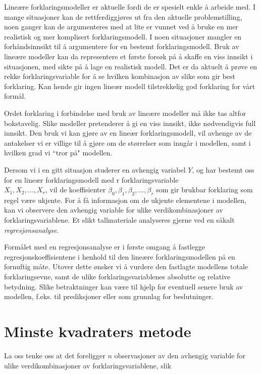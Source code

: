 Lineære forklaringsmodeller er aktuelle fordi de er spesielt enkle å
arbeide med.  I mange situasjoner kan de rettferdiggjøres ut fra den
aktuelle problemstilling, noen ganger kan de argumenteres med at lite er
vunnet ved å bruke en mer realistisk og mer komplisert forklaringsmodell.
I noen situasjoner mangler en forhåndsinnsikt til å argumentere for 
en bestemt forklaringsmodell.  Bruk av lineære modeller kan da
representere et første forsøk på å skaffe en viss innsikt
i situasjonen, med sikte på å lage en rea\-lis\-tisk modell.  Det er da
aktuelt å prøve en rekke forklaringsvariable for å se hvilken
kombinasjon av slike som gir best forklaring.  Kan hende gir ingen lineær
modell tilstrekkelig god forklaring for vårt formål.

Ordet forklaring i forbindelse med bruk av lineære modeller må ikke
tas altfor bokstavelig.  Slike modeller pretenderer å gi en viss innsikt,
ikke nødvendigvis full innsikt.  Den bruk vi kan gjøre av en lineær
for\-klaringsmodell, vil avhenge av de antakelser vi er villige til å 
gjøre om de størrelser som inngår i modellen, samt i hvilken grad
vi ``tror på" modellen.

Dersom vi i en gitt situasjon studerer en avhengig variabel $Y$, og har bestemt
oss for en lineær forklaringsmodell med r forklaringsvariable \\
$X_1,X_2, \ldots , X_r$, vil de koeffisienter ${\beta}_0, {\beta}_1,{\beta}_2,
\ldots , {\beta}_r $ som gir brukbar forklaring som regel være ukjente.
For å få informasjon om de ukjente elementene i modellen, kan vi
observere den avhengig variable for ulike verdikombinasjoner av
forklaringsvariablene.  Et slikt tallmateriale analyseres gjerne ved en
såkalt {\em regresjonsanalyse}.

Formålet med en regresjonsanalyse er i første omgang å fastlegge
regresjonskoeffisientene i henhold til den lineære forklaringsmodellen
på en fornuftig måte.  Utover dette ønsker vi å vurdere den
fastlagte modellens totale forklaringsevne, samt de ulike 
forklaringsvariablenes absolutte og rela\-tive betydning.  Slike betraktninger
kan være til hjelp for eventuell senere bruk av modellen, f.eks. til
prediksjoner eller som grunnlag for beslutninger. 

\section{Minste kvadraters metode}

La oss tenke oss at det foreligger $n$ observasjoner av den avhengig
variable for ulike verdikombinasjoner av forklaringsvariablene, slik

